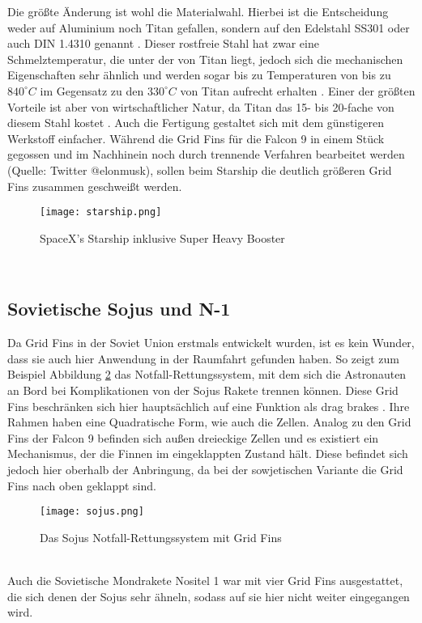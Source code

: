Die größte Änderung ist wohl die Materialwahl. Hierbei ist die Entscheidung weder auf Aluminium noch Titan gefallen, sondern auf den Edelstahl SS301 oder auch DIN 1.4310 genannt \cite{titanium}. Dieser rostfreie Stahl hat zwar eine Schmelztemperatur, die unter der von Titan liegt, jedoch sich die mechanischen Eigenschaften sehr ähnlich und werden sogar bis zu Temperaturen von bis zu $840^\circ C$ im Gegensatz zu den $330^\circ C$ von Titan aufrecht erhalten \cite{titanium}. Einer der größten Vorteile ist aber von wirtschaftlicher Natur, da Titan das 15- bis 20-fache von diesem Stahl kostet \cite{titanium}. Auch die Fertigung gestaltet sich mit dem günstigeren Werkstoff einfacher. Während die Grid Fins für die Falcon 9 in einem Stück gegossen und im Nachhinein noch durch trennende Verfahren bearbeitet werden (Quelle: Twitter @elonmusk), sollen beim Starship die deutlich größeren Grid Fins zusammen geschweißt werden.
\begin{figure}[h]
	\centering
	\texttt{[image: starship.png]}
	\begin{flushright}
	\end{flushright}
	\caption{SpaceX's Starship inklusive Super Heavy Booster}
	\label{abb_starship}
\end{figure}\\
\subsection{Sovietische Sojus und N-1}
Da Grid Fins in der Soviet Union erstmals entwickelt wurden, ist es kein Wunder, dass sie auch hier Anwendung in der Raumfahrt gefunden haben. So zeigt zum Beispiel Abbildung \ref{abb_sojus} das Notfall-Rettungssystem, mit dem sich die Astronauten an Bord bei Komplikationen von der Sojus Rakete trennen können. Diese Grid Fins beschränken sich hier hauptsächlich auf eine Funktion als drag brakes \cite{soyuz}. Ihre Rahmen haben eine Quadratische Form, wie auch die Zellen. Analog zu den Grid Fins der Falcon 9 befinden sich außen dreieckige Zellen und es existiert ein Mechanismus, der die Finnen im eingeklappten Zustand hält. Diese befindet sich jedoch hier oberhalb der Anbringung, da bei der sowjetischen Variante die Grid Fins nach oben geklappt sind.
\begin{figure}[h]
	\centering
	\texttt{[image: sojus.png]}
	\begin{flushright}
			\flushbottom{Quelle: NASA}
	\end{flushright}
	\caption{Das Sojus Notfall-Rettungssystem mit Grid Fins}
	\label{abb_sojus}
\end{figure}\\
Auch die Sovietische Mondrakete Nositel 1 war mit vier Grid Fins ausgestattet, die sich denen der Sojus sehr ähneln, sodass auf sie hier nicht weiter eingegangen wird.

